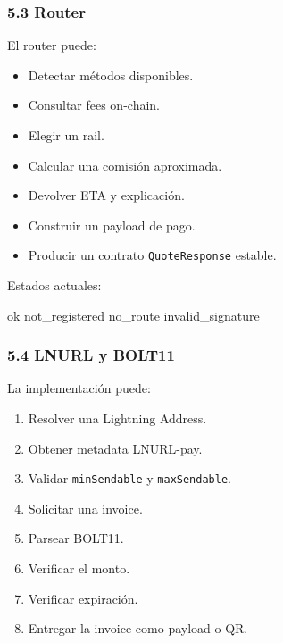 \documentclass[
]{article}
\newenvironment{Shaded}{}{}
\newcommand{\NormalTok}[1]{#1}
\providecommand{\tightlist}{%
  \setlength{\itemsep}{0pt}\setlength{\parskip}{0pt}}
\begin{document}
\hypertarget{router}{%
\subsubsection{5.3 Router}\label{router}}

El router puede:

\begin{itemize}
\tightlist
\item
  Detectar métodos disponibles.
\item
  Consultar fees on-chain.
\item
  Elegir un rail.
\item
  Calcular una comisión aproximada.
\item
  Devolver ETA y explicación.
\item
  Construir un payload de pago.
\item
  Producir un contrato \texttt{QuoteResponse} estable.
\end{itemize}

Estados actuales:

\begin{Shaded}
\begin{Highlighting}[]
\NormalTok{ok}
\NormalTok{not\_registered}
\NormalTok{no\_route}
\NormalTok{invalid\_signature}
\end{Highlighting}
\end{Shaded}

\hypertarget{lnurl-y-bolt11}{%
\subsubsection{5.4 LNURL y BOLT11}\label{lnurl-y-bolt11}}

La implementación puede:

\begin{enumerate}
\def\labelenumi{\arabic{enumi}.}
\tightlist
\item
  Resolver una Lightning Address.
\item
  Obtener metadata LNURL-pay.
\item
  Validar \texttt{minSendable} y \texttt{maxSendable}.
\item
  Solicitar una invoice.
\item
  Parsear BOLT11.
\item
  Verificar el monto.
\item
  Verificar expiración.
\item
  Entregar la invoice como payload o QR.
\end{enumerate}
\end{document}
